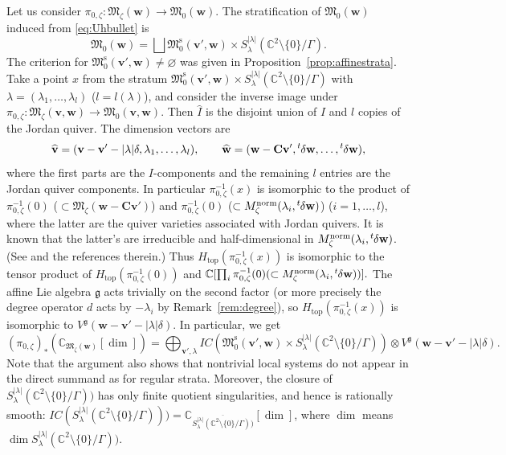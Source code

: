 \documentclass[pdftex]{sigma}
\theoremstyle{definition}
\numberwithin{equation}{section}
\newcommand{\propref}[1]{Proposition~\ref{#1}}
\newcommand{\remref}[1]{Remark~\ref{#1}}
\newcommand{\lsp}[2]{{\mskip-.3mu}{}^{#1}\mskip-1mu{#2}}
\newcommand{\C}{{\mathbb C}}
\newcommand{\g}{{\mathfrak g}}
\newcommand{\M}{{\mathfrak M}} %
\newcommand{\Mreg}{\M^{\operatorname{s}}}
\newcommand{\bv}{{\mathbf v}} %
\newcommand{\bw}{{\mathbf w}} %
\newcommand{\bC}{{\mathbf C}} %
\newcommand{\topdeg}{{\operatorname{top}}} %
\begin{document}
Let us consider $\pi_{0,\zeta}\colon \M_\zeta(\bw) \to \M_0(\bw)$.
The stratif\/ication of $\M_0(\bw)$ induced from \eqref{eq:Uhbullet} is
\begin{equation}\label{eq:0stratum}
   \M_0(\bw) = \bigsqcup \Mreg_0(\bv',\bw)\times
   S^{|\lambda|}_\lambda(\C^2\setminus\{0\}/\Gamma).
\end{equation}
The criterion for $\Mreg_0(\bv',\bw)\neq\varnothing$ was given in
\propref{prop:affinestrata}.
%
Take a point $x$ from the stratum $\Mreg_0(\bv',\bw)\times
S^{|\lambda|}_\lambda(\C^2\setminus\{0\}/\Gamma)$ with $\lambda =
(\lambda_1,\dots, \lambda_l)$ ($l=l(\lambda)$), and consider the
inverse image under $\pi_{0,\zeta}\colon \M_\zeta(\bv,\bw)\to
\M_0(\bv,\bw)$.
Then $\widehat{I}$ is the disjoint union of $I$ and $l$ copies of the
Jordan quiver. The dimension vectors are
\begin{equation*}
  \widehat{\bv} = (\bv - \bv' - |\lambda|\delta,
  \lambda_1,\dots,\lambda_l),
\qquad
  \widehat{\bw} = (\bw - \bC\bv',
  \lsp{t}{\delta}{\bw},\dots,\lsp{t}{\delta}{\bw}),
\end{equation*}
where the f\/irst parts are the $I$-components and the remaining $l$
entries are the Jordan quiver components. In particular
$\pi_{0,\zeta}^{-1}(x)$ is isomorphic to the product of
$\pi_{0,\zeta}^{-1}(0)$ ($\subset\M_\zeta(\bw-\bC\bv')$) and
$\pi_{0,\zeta}^{-1}(0)$ ($\subset
M_\zeta^{\text{norm}}(\lambda_i,\lsp{t}{\delta}\bw)$) ($i=1,\dots, l$),
where the latter are the quiver varieties associa\-ted with Jordan
quivers. It is known that the latter's are irreducible and
half-dimensional in
$M_\zeta^{\text{norm}}(\lambda_i,\lsp{t}{\delta}\bw)$. (See
\cite[Exercise~5.15]{Lecture} and the references therein.)  Thus
$H_{\topdeg}(\pi^{-1}_{0,\zeta}(x))$ is isomorphic to the tensor
product of $H_{\topdeg}(\pi^{-1}_{0,\zeta}(0))$ and
\(
   \C[\prod_i \pi_{0,\zeta}^{-1}(0)(\subset
   M_\zeta^{\text{norm}}(\lambda_i,\lsp{t}{\delta}\bw))].
\)
The af\/f\/ine Lie algebra $\g$ acts trivially on the second factor (or
more precisely the degree operator $d$ acts by $-\lambda_i$ by
\remref{rem:degree}), so $H_{\topdeg}(\pi^{-1}_{0,\zeta}(x))$ is
isomorphic to $V^\g(\bw - \bv' - |\lambda|\delta)$. In particular, we
get
\begin{equation*}
  (\pi_{0,\zeta})_*(\C_{\M_\zeta(\bw)}[\dim])
  = \bigoplus_{\bv',\lambda} IC(\Mreg_0(\bv',\bw)\times
  S^{|\lambda|}_\lambda(\C^2\setminus\{0\}/\Gamma))
  \otimes V^\g(\bw - \bv' - |\lambda|\delta).
\end{equation*}
Note that the argument also shows that nontrivial local systems do not
appear in the direct summand as for regular strata.
%
Moreover, the closure of
$S^{|\lambda|}_\lambda(\C^2\setminus\{0\}/\Gamma))$ has only f\/inite
quotient singularities, and hence is rationally smooth:
$IC(S^{|\lambda|}_\lambda(\C^2\setminus\{0\}/\Gamma))) =
\C_{\overline{S^{|\lambda|}_\lambda(\C^2\setminus\{0\}/\Gamma))}}[\dim]$,
where $\dim$ means $\dim
S^{|\lambda|}_\lambda(\C^2\setminus\{0\}/\Gamma))$.
\end{document}
